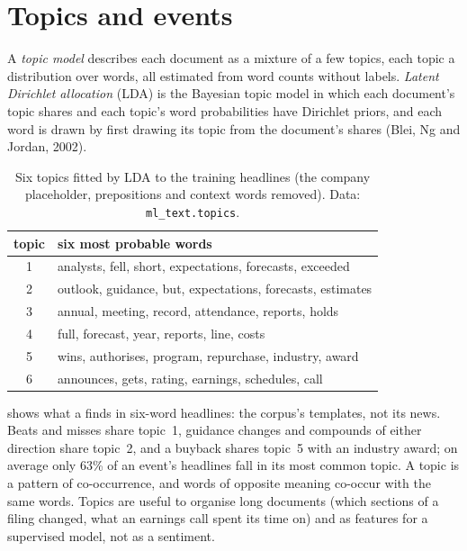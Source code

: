 \section{Topics and events}

\begin{definition}\label{def:ml:text-from-bag-of-words-to-embeddings:lda}
A \emph{topic model} describes each document as a mixture of a few topics, each topic a distribution over
words, all estimated from word counts without labels. \emph{Latent Dirichlet allocation}
(LDA) is the Bayesian topic model in which each document's topic shares and each topic's word probabilities have Dirichlet
priors, and each word is drawn by first drawing its topic from the document's shares (Blei, Ng and Jordan, 2002).
\end{definition}

\begin{table}[htbp]
\centering\small
\begin{tabular}{@{}cl@{}}
\toprule
topic & six most probable words\\
\midrule
1 & analysts, fell, short, expectations, forecasts, exceeded\\
2 & outlook, guidance, but, expectations, forecasts, estimates\\
3 & annual, meeting, record, attendance, reports, holds\\
4 & full, forecast, year, reports, line, costs\\
5 & wins, authorises, program, repurchase, industry, award\\
6 & announces, gets, rating, earnings, schedules, call\\
\bottomrule
\end{tabular}
\caption{Six topics fitted by LDA to the training headlines (the company placeholder, prepositions and context words
removed). Data: \texttt{ml\_text.topics}.}\label{tab:ml:text:topics}
\end{table}

 shows what a  finds in six-word headlines: the corpus's templates, not its news.
Beats and misses share topic~1, guidance changes and compounds of either direction share topic~2, and a buyback shares
topic~5 with an industry award; on
average only 63\% of an event's headlines fall in its most common topic. A topic is a pattern of co-occurrence, and words
of opposite meaning co-occur with the same words. Topics are useful to organise long documents (which sections of a
filing changed, what an earnings call spent its time on) and as features for a supervised model, not as a sentiment.

